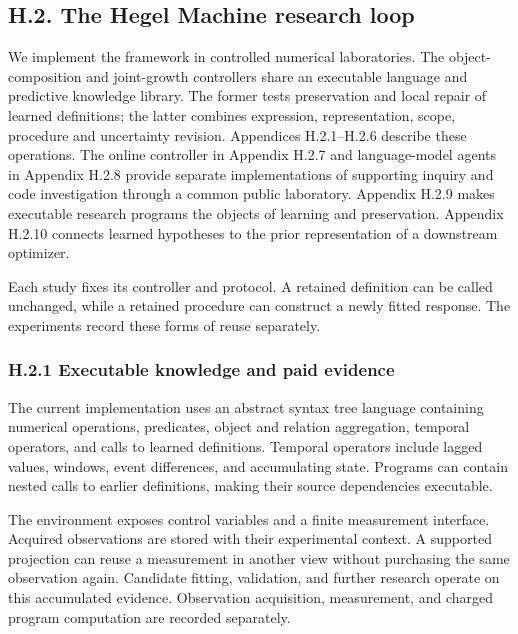 \documentclass[11pt,a4paper]{article}
\begin{document}
\subsection*{H.2. The Hegel Machine research loop}

We implement the framework in controlled numerical laboratories. The
object-composition and joint-growth controllers share an executable language and
predictive knowledge library. The former tests preservation and local repair of
learned definitions; the latter combines expression, representation, scope,
procedure and uncertainty revision. Appendices H.2.1–H.2.6 describe these operations.
The online controller in Appendix H.2.7 and language-model agents in Appendix H.2.8
provide separate implementations of supporting inquiry and code investigation
through a common public laboratory. Appendix H.2.9 makes executable research
programs the objects of learning and preservation. Appendix H.2.10 connects learned
hypotheses to the prior representation of a downstream optimizer.


Each study fixes its controller and protocol. A retained definition can be
called unchanged, while a retained procedure can construct a newly fitted
response. The experiments record these forms of reuse separately.


\subsubsection*{H.2.1 Executable knowledge and paid evidence}

The current implementation uses an abstract syntax tree language containing numerical operations, predicates, object and relation aggregation, temporal operators, and calls to learned definitions. Temporal operators include lagged values, windows, event differences, and accumulating state. Programs can contain nested calls to earlier definitions, making their source dependencies executable.


The environment exposes control variables and a finite measurement interface. Acquired observations are stored with their experimental context. A supported projection can reuse a measurement in another view without purchasing the same observation again. Candidate fitting, validation, and further research operate on this accumulated evidence. Observation acquisition, measurement, and charged program computation are recorded separately.
\end{document}

